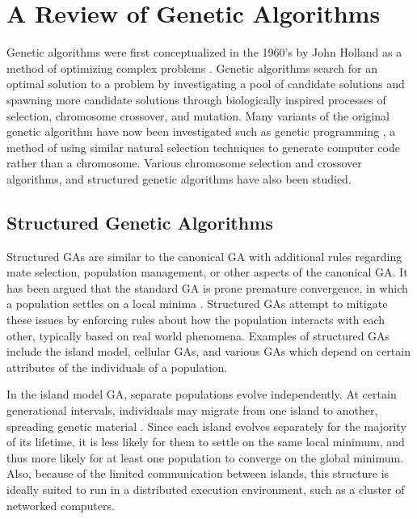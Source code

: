   \section{A Review of Genetic Algorithms} %
    Genetic algorithms were first conceptualized in the 1960’s by John Holland as a
      method of optimizing complex problems \cite{Goldberg1988}. 
    Genetic algorithms search for an optimal solution to a problem by
      investigating a pool of candidate solutions and spawning more candidate
      solutions through biologically inspired processes of selection,
      chromosome crossover, and mutation. 
    Many variants of the original genetic algorithm have now been investigated
      such as genetic programming \cite{Koza1994, Banzhaf2000}, a method of using
      similar natural selection techniques to generate computer code rather than
      a chromosome. 
    Various chromosome selection and crossover algorithms, and structured
      genetic algorithms have also been studied. 

  \subsection{Structured Genetic Algorithms} %
    Structured GAs are similar to the canonical GA with additional rules regarding
      mate selection, population management, or other aspects of the canonical GA. 
    It has been argued that the standard GA is prone premature convergence, in
    which a population settles on a local minima \cite{Fogel1994}. 
    Structured GAs attempt to mitigate these issues by enforcing rules about
      how the population interacts with each other, typically based on real world
      phenomena. 
    Examples of structured GAs include the island model, cellular GAs, and
      various GAs which depend on certain attributes of the individuals of a
      population.

    In the island model GA, separate populations evolve independently. 
    At certain generational intervals, individuals may migrate from one island
      to another, spreading genetic material \cite{Whitley1999, Artyushenko2009}.
    Since each island evolves separately for the majority of its lifetime, it
      is less likely for them to settle on the same local minimum, and thus more
      likely for at least one population to converge on the global minimum. 
    Also, because of the limited communication between islands, this structure
      is ideally suited to run in a distributed execution environment, such as a
      cluster of networked computers.

